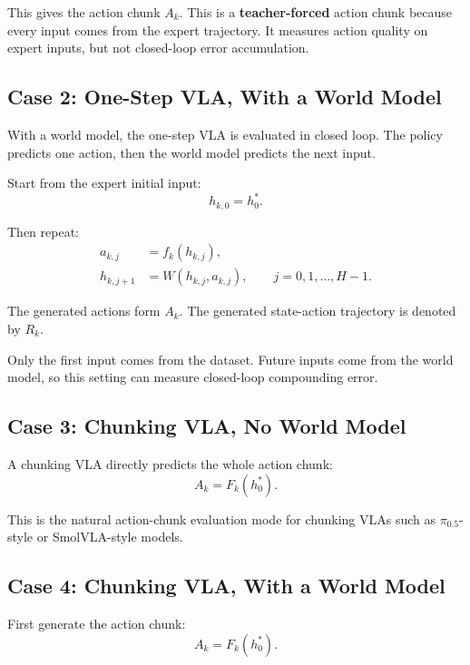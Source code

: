 \documentclass[11pt]{article}
\begin{document}
This gives the action chunk $A_k$.
This is a \textbf{teacher-forced} action chunk because every input comes from the expert trajectory.
It measures action quality on expert inputs, but not closed-loop error accumulation.

\subsection{Case 2: One-Step VLA, With a World Model}

With a world model, the one-step VLA is evaluated in closed loop.
The policy predicts one action, then the world model predicts the next input.

Start from the expert initial input:
\begin{equation}
h_{k,0}=h^*_0.
\end{equation}

Then repeat:
\begin{align}
a_{k,j} &= f_k(h_{k,j}), \\
h_{k,j+1} &= W(h_{k,j},a_{k,j}),
\qquad j=0,1,\ldots,H-1.
\end{align}

The generated actions form $A_k$.
The generated state-action trajectory is denoted by $R_k$.

Only the first input comes from the dataset. Future inputs come from the world model, so this setting can measure closed-loop compounding error.

\subsection{Case 3: Chunking VLA, No World Model}

A chunking VLA directly predicts the whole action chunk:
\begin{equation}
A_k=F_k(h^*_0).
\end{equation}

This is the natural action-chunk evaluation mode for chunking VLAs such as $\pi_{0.5}$-style or SmolVLA-style models.

\subsection{Case 4: Chunking VLA, With a World Model}

First generate the action chunk:
\begin{equation}
A_k=F_k(h^*_0).
\end{equation}
\end{document}
